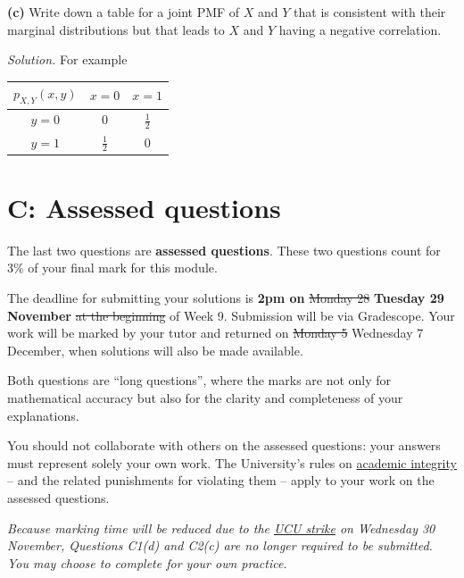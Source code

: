 \documentclass[
  a4paper,
]{book}
\theoremstyle{definition}
\theoremstyle{definition}
\theoremstyle{definition}
\theoremstyle{definition}
\theoremstyle{remark}
\begin{document}
\textbf{(c)} Write down a table for a joint PMF of \(X\) and \(Y\) that is consistent with their marginal distributions but that leads to \(X\) and \(Y\) having a negative correlation.

\begin{myanswers}

\emph{Solution.} For example

\begin{longtable}[]{@{}ccc@{}}
\toprule()
\(p_{X,Y}(x,y)\) & \(x = 0\) & \(x = 1\) \\
\midrule()
\endhead
\(y = 0\) & \(0\) & \(\frac12\) \\
\(y = 1\) & \(\frac12\) & \(0\) \\
\bottomrule()
\end{longtable}

\end{myanswers}

\hypertarget{P4-assessed}{%
\section*{C: Assessed questions}\label{P4-assessed}}

The last two questions are \textbf{assessed questions}. These two questions count for 3\% of your final mark for this module.

The deadline for submitting your solutions is \textbf{2pm on} \sout{Monday 28} \textbf{Tuesday 29 November} \sout{at the beginning} of Week 9. Submission will be via Gradescope.
Your work will be marked by your tutor and returned on \sout{Monday 5} Wednesday 7 December, when solutions will also be made available.

Both questions are ``long questions'', where the marks are not only for mathematical accuracy but also for the clarity and completeness of your explanations.

You should not collaborate with others on the assessed questions: your answers must represent solely your own work. The University's rules on \href{https://library.leeds.ac.uk/info/1401/academic_skills/46/academic_integrity_and_plagiarism}{academic integrity} -- and the related punishments for violating them -- apply to your work on the assessed questions.

\emph{Because marking time will be reduced due to the \href{https://www.leedsucu.org.uk/information-for-students-2/}{UCU strike} on Wednesday 30 November, Questions C1(d) and C2(c) are no longer required to be submitted. You may choose to complete for your own practice.}
\end{document}
